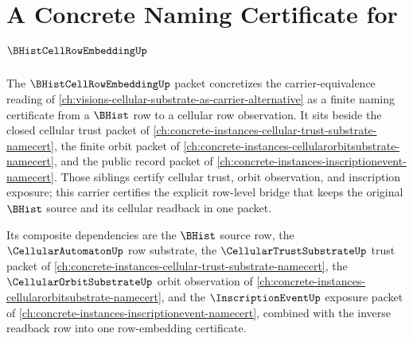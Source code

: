 \chapter{A Concrete Naming Certificate for $\BHistCellRowEmbeddingUp$}
\label{ch:concrete-instances-bhist-cell-row-embedding-namecert}

The $\BHistCellRowEmbeddingUp$ packet concretizes the carrier-equivalence reading of \autoref{ch:visions-cellular-substrate-as-carrier-alternative} as a finite naming certificate from a $\BHist$ row to a cellular row observation. It sits beside the closed cellular trust packet of \autoref{ch:concrete-instances-cellular-trust-substrate-namecert}, the finite orbit packet of \autoref{ch:concrete-instances-cellularorbitsubstrate-namecert}, and the public record packet of \autoref{ch:concrete-instances-inscriptionevent-namecert}. Those siblings certify cellular trust, orbit observation, and inscription exposure; this carrier certifies the explicit row-level bridge that keeps the original $\BHist$ source and its cellular readback in one packet.

Its composite dependencies are the $\BHist$ source row, the $\CellularAutomatonUp$ row substrate, the $\CellularTrustSubstrateUp$ trust packet of \autoref{ch:concrete-instances-cellular-trust-substrate-namecert}, the $\CellularOrbitSubstrateUp$ orbit observation of \autoref{ch:concrete-instances-cellularorbitsubstrate-namecert}, and the $\InscriptionEventUp$ exposure packet of \autoref{ch:concrete-instances-inscriptionevent-namecert}, combined with the inverse readback row into one row-embedding certificate.



